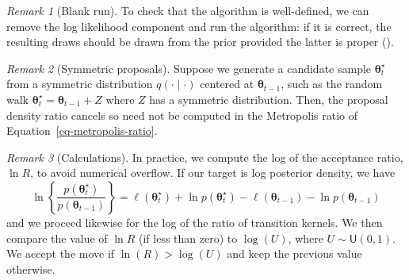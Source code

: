 \documentclass[
  11pt,
  letterpaper,
]{scrbook}
\theoremstyle{definition}
\theoremstyle{definition}
\theoremstyle{definition}
\theoremstyle{plain}
\theoremstyle{plain}
\theoremstyle{remark}
\newtheorem*{remark}{Remark}
\begin{document}
\begin{remark}[Blank run]
To check that the algorithm is well-defined, we can remove the log
likelihood component and run the algorithm: if it is correct, the
resulting draws should be drawn from the prior provided the latter is
proper ().
\end{remark}

\begin{remark}[Symmetric proposals]
Suppose we generate a candidate sample \(\boldsymbol{\theta}_t^{\star}\)
from a symmetric distribution \(q(\cdot \mid \cdot)\) centered at
\(\boldsymbol{\theta}_{t-1}\), such as the random walk
\(\boldsymbol{\theta}_t^{\star} =\boldsymbol{\theta}_{t-1}+ Z\) where
\(Z\) has a symmetric distribution. Then, the proposal density ratio
cancels so need not be computed in the Metropolis ratio of
Equation~\ref{eq-metropolis-ratio}.
\end{remark}

\begin{remark}[Calculations]
In practice, we compute the log of the acceptance ratio, \(\ln R\), to
avoid numerical overflow. If our target is log posterior density, we
have \[
\ln \left\{\frac{p(\boldsymbol{\theta}_t^{\star})}{p(\boldsymbol{\theta}_{t-1})}\right\} = \ell(\boldsymbol{\theta}_t^{\star}) + \ln p(\boldsymbol{\theta}_t^{\star}) - \ell(\boldsymbol{\theta}_{t-1}) - \ln p(\boldsymbol{\theta}_{t-1}) 
\] and we proceed likewise for the log of the ratio of transition
kernels. We then compare the value of \(\ln R\) (if less than zero) to
\(\log(U)\), where \(U \sim \mathsf{U}(0,1)\). We accept the move if
\(\ln(R) >\log(U)\) and keep the previous value otherwise.
\end{remark}
\end{document}
